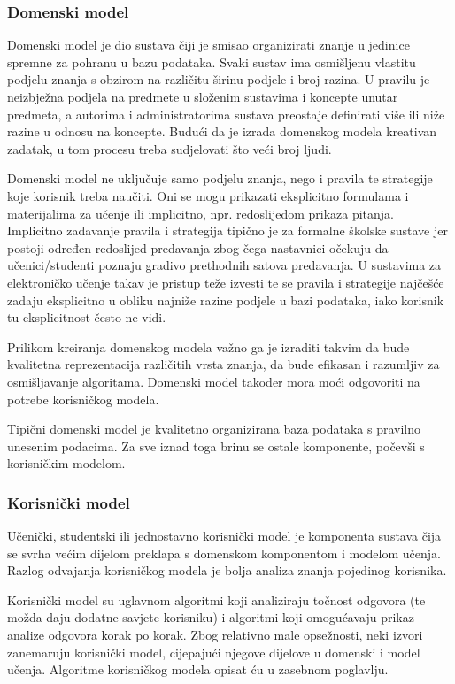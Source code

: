\documentclass[times, utf8, zavrsni, numeric]{fer}
\begin{document}
\subsubsection{Domenski model}
Domenski model je dio sustava čiji je smisao organizirati znanje u jedinice spremne za pohranu u bazu podataka.\citep{markurban} Svaki sustav ima osmišljenu vlastitu podjelu znanja s obzirom na različitu širinu podjele i broj razina. U pravilu je neizbježna podjela na predmete u složenim sustavima i koncepte unutar predmeta, a autorima i administratorima sustava preostaje definirati više ili niže razine u odnosu na koncepte. Budući da je izrada domenskog modela kreativan zadatak, u tom procesu treba sudjelovati što veći broj ljudi.
\par
Domenski model ne uključuje samo podjelu znanja, nego i pravila te strategije koje korisnik treba naučiti. Oni se mogu prikazati eksplicitno formulama i materijalima za učenje ili implicitno, npr. redoslijedom prikaza pitanja. Implicitno zadavanje pravila i strategija tipično je za formalne školske sustave jer postoji određen redoslijed predavanja zbog čega nastavnici očekuju da učenici/studenti poznaju gradivo prethodnih satova predavanja. U sustavima za elektroničko učenje takav je pristup teže izvesti te se pravila i strategije najčešće zadaju eksplicitno u obliku najniže razine podjele u bazi podataka, iako korisnik tu eksplicitnost često ne vidi.
\par
Prilikom kreiranja domenskog modela važno ga je izraditi takvim da bude kvalitetna reprezentacija različitih vrsta znanja, da bude efikasan i razumljiv za osmišljavanje algoritama. Domenski model također mora moći odgovoriti na potrebe korisničkog modela.
\par
Tipični domenski model je kvalitetno organizirana baza podataka s pravilno unesenim podacima. Za sve iznad toga brinu se ostale komponente, počevši s korisničkim modelom.

\subsubsection{Korisnički model}
Učenički, studentski ili jednostavno korisnički model je komponenta sustava čija se svrha većim dijelom preklapa s domenskom komponentom i modelom učenja. Razlog odvajanja korisničkog modela je bolja analiza znanja pojedinog korisnika. 
\par
Korisnički model su uglavnom algoritmi koji analiziraju točnost odgovora (te možda daju dodatne savjete korisniku) i algoritmi koji omogućavaju prikaz analize odgovora korak po korak.\citep{markurban} Zbog relativno male opsežnosti, neki izvori zanemaruju korisnički model, cijepajući njegove dijelove u domenski i model učenja. Algoritme korisničkog modela opisat ću u zasebnom poglavlju.
\end{document}
